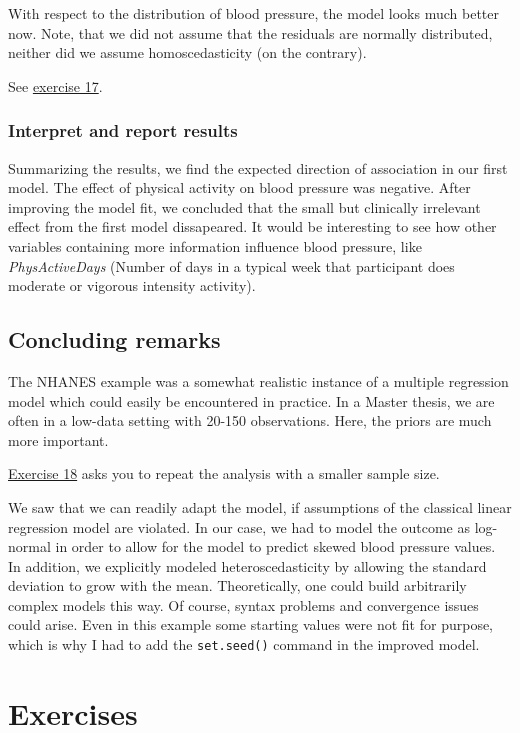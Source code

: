 \documentclass[
]{book}
\begin{document}
With respect to the distribution of blood pressure, the model looks much better now.
Note, that we did not assume that the residuals are normally distributed, neither
did we assume homoscedasticity (on the contrary).

See \hyperref[exercise17_multiple_regression]{exercise 17}.

\subsubsection{Interpret and report results}\label{interpret-and-report-results}

Summarizing the results, we find the expected direction of association in our first model.
The effect of physical activity on blood pressure was negative.
After improving the model fit, we concluded that the small but clinically irrelevant effect
from the first model dissapeared.
It would be interesting to see how other variables containing more information
influence blood pressure, like \emph{PhysActiveDays} (Number of days in a typical week
that participant does moderate or vigorous intensity activity).

\subsection{Concluding remarks}\label{concluding-remarks}

The NHANES example was a somewhat realistic instance of a multiple regression model
which could easily be encountered in practice. In a Master thesis, we are often in
a low-data setting with 20-150 observations. Here, the priors are much more important.

\hyperref[exercise18_multiple_regression]{Exercise 18} asks you to repeat the analysis
with a smaller sample size.

We saw that we can readily adapt the model, if assumptions of the classical
linear regression model are violated. In our case, we had to model the outcome
as log-normal in order to allow for the model to predict skewed blood pressure values.
In addition, we explicitly modeled heteroscedasticity by allowing the standard deviation
to grow with the mean. Theoretically, one could build arbitrarily complex models
this way. Of course, syntax problems and convergence issues could arise.
Even in this example some starting values were not fit for purpose, which is why
I had to add the \texttt{set.seed()} command in the improved model.

\section{Exercises}\label{exercises-2}
\end{document}
